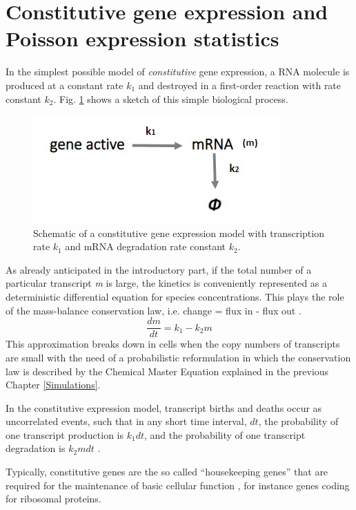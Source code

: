 \documentclass[12pt,a4paper]{report}
\begin{document}
\section{Constitutive gene expression and Poisson expression statistics}
In the simplest possible model of \emph{constitutive} gene expression, a RNA molecule is produced at a constant rate $k_{1}$ and destroyed in a first-order reaction with rate constant $k_{2}$. Fig. \ref{costitutiveexpression} shows a sketch of this simple biological process.

\begin{figure}[!ht]
\centering
\includegraphics[scale=0.64]{costitutiveexpression.jpg}
\caption{Schematic of a constitutive gene expression model with transcription rate $k_{1}$ and mRNA degradation rate constant $k_{2}$.}
\label{costitutiveexpression}
\end{figure}

As already anticipated in the introductory part, if the total number of a particular transcript \emph{m} is large, the kinetics is conveniently represented as a deterministic differential equation for species concentrations. This plays the role of the mass-balance conservation law, i.e. change = flux in - flux out \cite{geneexpressionnoise}.
\begin{equation}\label{RNAcostitutiveexpressionequation}
 \frac{dm}{dt} = k_{1} - k_{2}m
\end{equation}
This approximation breaks down in cells when the copy numbers of transcripts are small with the need of a probabilistic reformulation in which the conservation law is described by the Chemical Master Equation explained in the previous Chapter \ref{Simulations}. 

In the constitutive expression model, transcript births and deaths occur as uncorrelated events, such that in any short time interval, $dt$, the probability of one transcript production is $k_{1}dt$, and the probability of one transcript degradation is $k_{2}mdt$ \cite{geneexpressionnoise}.

Typically, constitutive genes are the so called ``housekeeping genes'' that are required for the maintenance of basic cellular function \cite{housekeepinggene}, for instance genes coding for ribosomal proteins.
\end{document}
